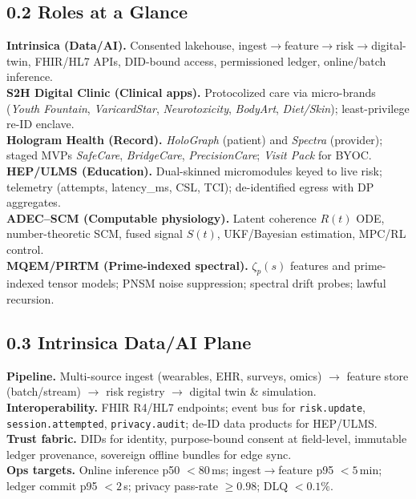 \documentclass[11pt]{article}
\theoremstyle{plain}
\begin{document}
\subsection*{0.2 Roles at a Glance}
\textbf{Intrinsica (Data/AI).} Consented lakehouse, ingest$\rightarrow$feature$\rightarrow$risk$\rightarrow$digital-twin, FHIR/HL7 APIs, DID-bound access, permissioned ledger, online/batch inference.\\
\textbf{S2H Digital Clinic (Clinical apps).} Protocolized care via micro-brands (\emph{Youth Fountain}, \emph{VaricardStar}, \emph{Neurotoxicity}, \emph{BodyArt}, \emph{Diet/Skin}); least-privilege re-ID enclave.\\
\textbf{Hologram Health (Record).} \emph{HoloGraph} (patient) and \emph{Spectra} (provider); staged MVPs \emph{SafeCare}, \emph{BridgeCare}, \emph{PrecisionCare}; \emph{Visit Pack} for BYOC.\\
\textbf{HEP/ULMS (Education).} Dual-skinned micromodules keyed to live risk; telemetry (attempts, latency\_ms, CSL, TCI); de-identified egress with DP aggregates.\\
\textbf{ADEC--SCM (Computable physiology).} Latent coherence $R(t)$ ODE, number-theoretic SCM, fused signal $S(t)$, UKF/Bayesian estimation, MPC/RL control.\\
\textbf{MQEM/PIRTM (Prime-indexed spectral).} $\zeta_p(s)$ features and prime-indexed tensor models; PNSM noise suppression; spectral drift probes; lawful recursion.

\subsection*{0.3 Intrinsica Data/AI Plane}
\textbf{Pipeline.} Multi-source ingest (wearables, EHR, surveys, omics) $\rightarrow$ feature store (batch/stream) $\rightarrow$ risk registry $\rightarrow$ digital twin \& simulation.\\
\textbf{Interoperability.} FHIR R4/HL7 endpoints; event bus for \texttt{risk.update}, \texttt{session.attempted}, \texttt{privacy.audit}; de-ID data products for HEP/ULMS.\\
\textbf{Trust fabric.} DIDs for identity, purpose-bound consent at field-level, immutable ledger provenance, sovereign offline bundles for edge sync.\\
\textbf{Ops targets.} Online inference p50 $<80$\,ms; ingest$\rightarrow$feature p95 $<5$\,min; ledger commit p95 $<2$\,s; privacy pass-rate $\ge 0.98$; DLQ $<0.1\%$.
\end{document}
